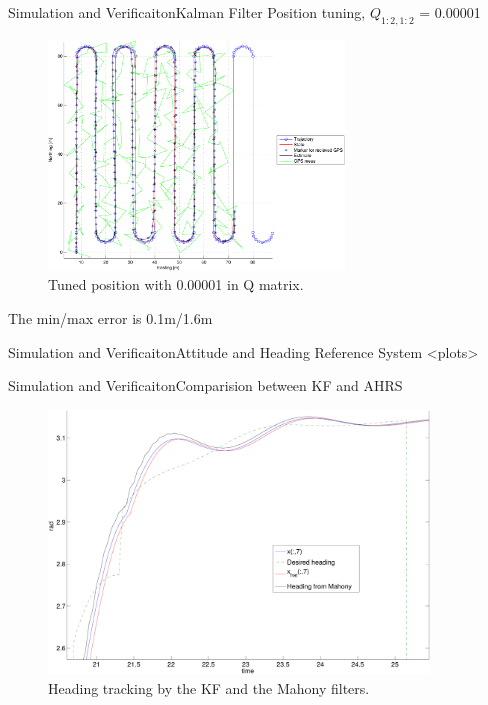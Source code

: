 \documentclass[10pt,handout]{beamer}
\begin{document}
\begin{frame}{Simulation and Verificaiton}{Kalman Filter}
Position tuning, $Q_{1:2,1:2}$ = 0.00001
  \begin{figure}
    \includegraphics[width=0.7\textwidth]{../../code/matlab/q0,00001}
    \caption{\scriptsize Tuned position with 0.00001 in Q matrix.}
    \label{fig:q0.00001}
  \end{figure}
  The min/max error is 0.1m/1.6m
\end{frame}

\begin{frame}{Simulation and Verificaiton}{Attitude and Heading Reference System}
<plots>
\end{frame}

\begin{frame}{Simulation and Verificaiton}{Comparision between KF and AHRS}
  \begin{figure}
    \includegraphics[width=0.9\textwidth]{../../code/matlab/mahonyvskf}
    \caption{\scriptsize Heading tracking by the KF and the Mahony filters.}
    \label{fig:mavskf}
  \end{figure}
\end{frame}
\end{document}
